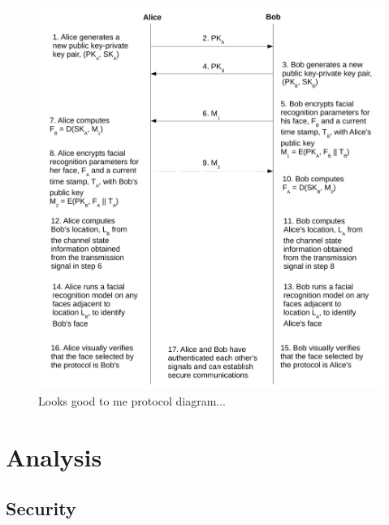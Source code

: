\documentclass[12pt]{report}
\begin{document}
\begin{figure}
\center
\includegraphics[scale=0.6]{figures/looks-good-to-me-protocol-diagram--no-legend.pdf}
\caption{Looks good to me protocol diagram...}
\label{protocol-diagram}
\end{figure}


\section{Analysis}
\subsection{Security}
\end{document}
